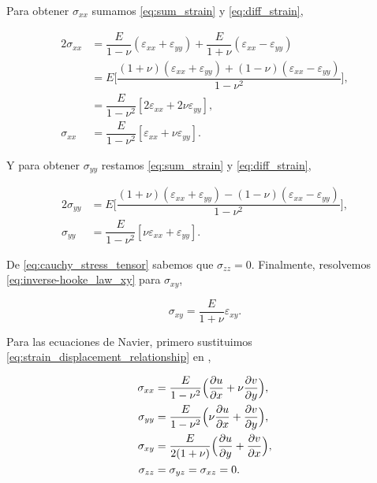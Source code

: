 \documentclass[./../main.tex]{subfiles}
\begin{document}
    \pagebreak
    Para obtener \(\sigma_{xx}\) sumamos \cref{eq:sum_strain} y \cref{eq:diff_strain},

    \begin{align}
        2\sigma_{xx} &= \dfrac{E}{1 - \nu}(\varepsilon_{xx} + \varepsilon_{yy}) + \dfrac{E}{1 + \nu}(\varepsilon_{xx} - \varepsilon_{yy})\nonumber\\
        &= E\Biggl[\dfrac{(1 + \nu)(\varepsilon_{xx} + \varepsilon_{yy}) + (1 - \nu)(\varepsilon_{xx} - \varepsilon_{yy})}{1 - \nu^{2}}\Biggr],\nonumber\\
        &= \dfrac{E}{1 - \nu^{2}}[2\varepsilon_{xx} + 2\nu\varepsilon_{yy}],\nonumber\\
        \sigma_{xx} &= \dfrac{E}{1 - \nu^{2}}[\varepsilon_{xx} + \nu\varepsilon_{yy}].\label{eq:sigma_xx}
    \end{align}

    Y para obtener \(\sigma_{yy}\) restamos \cref{eq:sum_strain} y \cref{eq:diff_strain},

    \begin{align}
        2\sigma_{yy} &= E\Biggl[\dfrac{(1 + \nu)(\varepsilon_{xx} + \varepsilon_{yy}) - (1 - \nu)(\varepsilon_{xx} - \varepsilon_{yy})}{1 - \nu^{2}}\Biggr],\nonumber\\
        \sigma_{yy} &= \dfrac{E}{1 - \nu^{2}}[\nu\varepsilon_{xx} + \varepsilon_{yy}].\label{eq:sigma_yy}
    \end{align}

    De \cref{eq:cauchy_stress_tensor} sabemos que \(\sigma_{zz} = 0\). Finalmente, resolvemos \cref{eq:inverse-hooke_law_xy} para \(\sigma_{xy}\),

    \begin{equation}
        \sigma_{xy} = \dfrac{E}{1 + \nu}\varepsilon_{xy}.
        \label{eq:sigma_xy}
    \end{equation}

    Para las ecuaciones de Navier, primero sustituimos \cref{eq:strain_displacement_relationship} en ,

    \begin{align*}
        \sigma_{xx} &= \dfrac{E}{1 - \nu^{2}}\Bigl(\pdv{u}{x} + \nu\pdv{v}{y}\Bigr),\\
        \sigma_{yy} &= \dfrac{E}{1 - \nu^{2}}\Bigl(\nu\pdv{u}{x} + \pdv{v}{y}\Bigr),\\
        \sigma_{xy} &= \dfrac{E}{2(1 + \nu)}\Bigl(\pdv{u}{y} + \pdv{v}{x}\Bigr),\\
        \sigma_{zz} &= \sigma_{yz} = \sigma_{xz} = 0.
    \end{align*}
\end{document}
